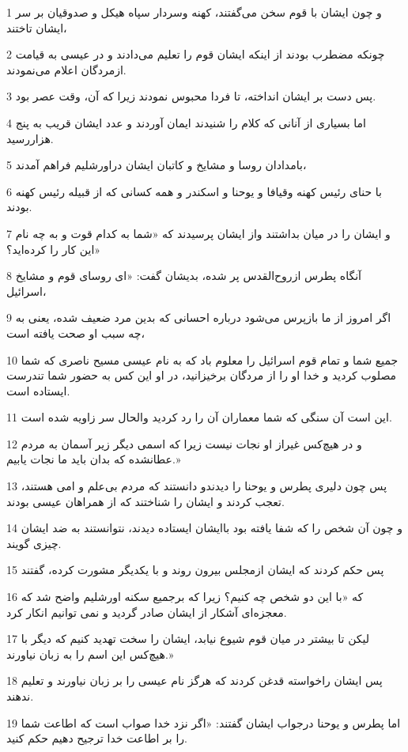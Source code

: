\par 1 و چون ایشان با قوم سخن می‌گفتند، کهنه وسردار سپاه هیکل و صدوقیان بر سر ایشان تاختند،
\par 2 چونکه مضطرب بودند از اینکه ایشان قوم را تعلیم می‌دادند و در عیسی به قیامت ازمردگان اعلام می‌نمودند.
\par 3 پس دست بر ایشان انداخته، تا فردا محبوس نمودند زیرا که آن، وقت عصر بود.
\par 4 اما بسیاری از آنانی که کلام را شنیدند ایمان آوردند و عدد ایشان قریب به پنج هزاررسید.
\par 5 بامدادان روسا و مشایخ و کاتبان ایشان دراورشلیم فراهم آمدند،
\par 6 با حنای رئیس کهنه وقیافا و یوحنا و اسکندر و همه کسانی که از قبیله رئیس کهنه بودند.
\par 7 و ایشان را در میان بداشتند واز ایشان پرسیدند که «شما به کدام قوت و به چه نام این کار را کرده‌اید؟»
\par 8 آنگاه پطرس ازروح‌القدس پر شده، بدیشان گفت: «ای روسای قوم و مشایخ اسرائیل،
\par 9 اگر امروز از ما بازپرس می‌شود درباره احسانی که بدین مرد ضعیف شده، یعنی به چه سبب او صحت یافته است،
\par 10 جمیع شما و تمام قوم اسرائیل را معلوم باد که به نام عیسی مسیح ناصری که شما مصلوب کردید و خدا او را از مردگان برخیزانید، در او این کس به حضور شما تندرست ایستاده است.
\par 11 این است آن سنگی که شما معماران آن را رد کردید والحال سر زاویه شده است.
\par 12 و در هیچ‌کس غیراز او نجات نیست زیرا که اسمی دیگر زیر آسمان به مردم عطانشده که بدان باید ما نجات یابیم.»
\par 13 پس چون دلیری پطرس و یوحنا را دیدندو دانستند که مردم بی‌علم و امی هستند، تعجب کردند و ایشان را شناختند که از همراهان عیسی بودند.
\par 14 و چون آن شخص را که شفا یافته بود باایشان ایستاده دیدند، نتوانستند به ضد ایشان چیزی گویند.
\par 15 پس حکم کردند که ایشان ازمجلس بیرون روند و با یکدیگر مشورت کرده، گفتند
\par 16 که «با این دو شخص چه کنیم؟ زیرا که برجمیع سکنه اورشلیم واضح شد که معجزه‌ای آشکار از ایشان صادر گردید و نمی توانیم انکار کرد.
\par 17 لیکن تا بیشتر در میان قوم شیوع نیابد، ایشان را سخت تهدید کنیم که دیگر با هیچ‌کس این اسم را به زبان نیاورند.»
\par 18 پس ایشان راخواسته قدغن کردند که هرگز نام عیسی را بر زبان نیاورند و تعلیم ندهند.
\par 19 اما پطرس و یوحنا درجواب ایشان گفتند: «اگر نزد خدا صواب است که اطاعت شما را بر اطاعت خدا ترجیح دهیم حکم کنید.
